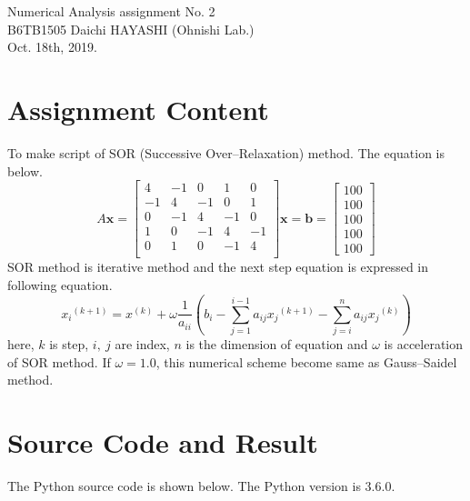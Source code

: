 \documentclass[a4paper,11pt]{article}
\begin{document}
%
\begin{center}
  {\fontsize{16pt}{16pt}\selectfont Numerical Analysis assignment No. 2\\}
  \vspace{16pt}
  \fontsize{10.5pt}{12pt}\selectfont
  B6TB1505 Daichi HAYASHI (Ohnishi Lab.)\\
  \vspace{10.5pt}
  Oct. 18th, 2019.\\
  \vspace{-2mm}
\end{center}

\section{Assignment Content}
To make script of SOR (Successive Over–Relaxation) method. The equation is below.
\begin{equation}
	A\bm{x} = \begin{bmatrix}
		4 & -1 & 0 & 1 & 0 \\
		-1 & 4 & -1 & 0 & 1 \\
		0 & -1 & 4 & -1 & 0 \\
		1 & 0 & -1 & 4 & -1 \\
		0 & 1 & 0 & -1 & 4 \\
	\end{bmatrix}\bm{x} = \bm{b} = \begin{bmatrix}
		100 \\
		100 \\
		100 \\
		100 \\
		100 
	\end{bmatrix}
\end{equation}
SOR method is iterative method and the next step equation is expressed in following equation.
\begin{equation}
	{x_i}^{(k+1)} = x^{(k)} + \omega \dfrac1{a_{ii}}\left( b_i - \sum^{i-1}_{j=1}a_{ij}{x_j}^{(k+1)} - \sum^{n}_{j=i}a_{ij}{x_j}^{(k)} \right)
\end{equation}
here, $k$ is step, $i,\ j$ are index, $n$ is the dimension of equation and $\omega$ is acceleration of SOR method. If $\omega = 1.0$, this numerical scheme become same as Gauss–Saidel method.

\section{Source Code and Result}
The Python source code is shown below. The Python version is 3.6.0.

\end{document}
